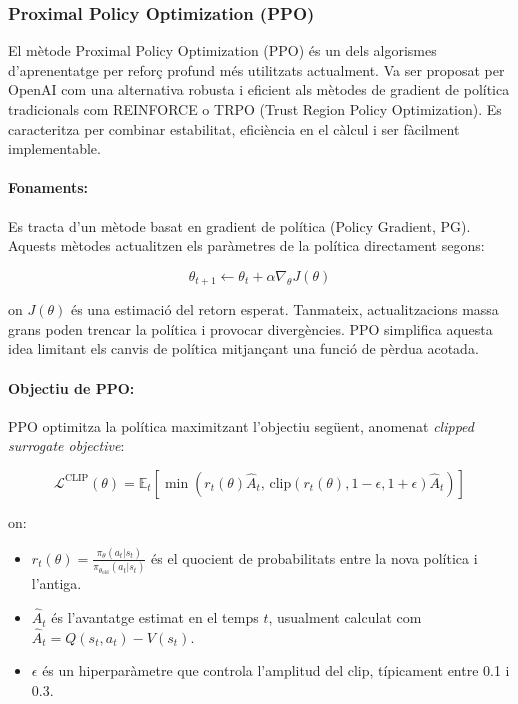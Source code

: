 \documentclass[12pt,a4paper,twoside]{book}
\begin{document}
\subsubsection{Proximal Policy Optimization (PPO)}

El mètode Proximal Policy Optimization (PPO) és un dels algorismes d'aprenentatge per reforç profund més utilitzats actualment. Va ser proposat per OpenAI com una alternativa robusta i eficient als mètodes de gradient de política tradicionals com REINFORCE o TRPO (Trust Region Policy Optimization)\cite{}. Es caracteritza per combinar estabilitat,  eficiència en el càlcul i ser fàcilment implementable.

\paragraph{Fonaments:}

Es tracta d'un mètode basat en gradient de política (Policy Gradient, PG). Aquests mètodes actualitzen els paràmetres de la política directament segons:

\begin{equation}
\theta_{t+1} \leftarrow \theta_t + \alpha \nabla_\theta J(\theta)
\end{equation}

on $J(\theta)$ és una estimació del retorn esperat. Tanmateix, actualitzacions massa grans poden trencar la política i provocar divergències. PPO simplifica aquesta idea limitant els canvis de política mitjançant una funció de pèrdua acotada.

\paragraph{Objectiu de PPO:}

PPO optimitza la política maximitzant l'objectiu següent, anomenat \textit{clipped surrogate objective}:

\begin{equation}
\mathcal{L}^{\text{CLIP}}(\theta) = \mathbb{E}_t \left[ \min \left( r_t(\theta) \hat{A}_t, \, \text{clip}(r_t(\theta), 1 - \epsilon, 1 + \epsilon) \hat{A}_t \right) \right]
\end{equation}

on:
\begin{itemize}
  \item $r_t(\theta) = \frac{\pi_\theta(a_t | s_t)}{\pi_{\theta_{\text{old}}}(a_t | s_t)}$ és el quocient de probabilitats entre la nova política i l'antiga.
  \item $\hat{A}_t$ és l'avantatge estimat en el temps $t$, usualment calculat com $\hat{A}_t = Q(s_t,a_t) - V(s_t)$.
  \item $\epsilon$ és un hiperparàmetre que controla l'amplitud del clip, típicament entre 0.1 i 0.3.
\end{itemize}
\end{document}
